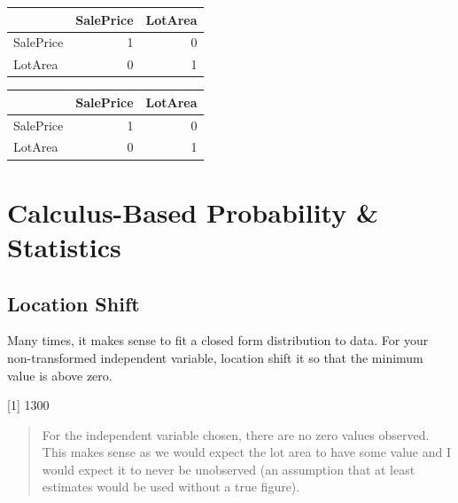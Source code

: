 \documentclass[]{article}
\newenvironment{Shaded}{\begin{snugshade}}{\end{snugshade}}
\newcommand{\KeywordTok}[1]{\textcolor[rgb]{0.13,0.29,0.53}{\textbf{{#1}}}}
\newcommand{\StringTok}[1]{\textcolor[rgb]{0.31,0.60,0.02}{{#1}}}
\newcommand{\NormalTok}[1]{{#1}}
\begin{document}
\begin{longtable}[]{@{}lrr@{}}
\toprule
& SalePrice & LotArea\tabularnewline
\midrule
\endhead
SalePrice & 1 & 0\tabularnewline
LotArea & 0 & 1\tabularnewline
\bottomrule
\end{longtable}

\begin{Shaded}
\end{Shaded}

\begin{longtable}[]{@{}lrr@{}}
\toprule
& SalePrice & LotArea\tabularnewline
\midrule
\endhead
SalePrice & 1 & 0\tabularnewline
LotArea & 0 & 1\tabularnewline
\bottomrule
\end{longtable}

\newpage

\section{Calculus-Based Probability \&
Statistics}\label{calculus-based-probability-statistics}

\subsection{Location Shift}\label{location-shift}

Many times, it makes sense to fit a closed form distribution to data.
For your non-transformed independent variable, location shift it so that
the minimum value is above zero.

\begin{Shaded}
\end{Shaded}

{[}1{]} 1300

\begin{quote}
For the independent variable chosen, there are no zero values observed.
This makes sense as we would expect the lot area to have some value and
I would expect it to never be unobserved (an assumption that at least
estimates would be used without a true figure).
\end{quote}
\end{document}
